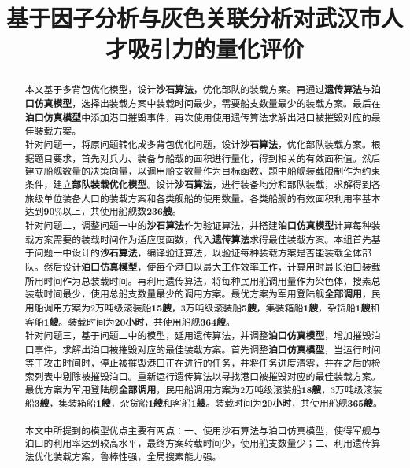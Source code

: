 \documentclass{whutmod}
\title{基于因子分析与灰色关联分析对武汉市人才吸引力的量化评价}
\begin{document}
	
	\begin{abstract}



本文基于多背包优化模型，设计\textbf{沙石算法}，优化部队的装载方案。再通过\textbf{遗传算法}与\textbf{泊口仿真模型}，选择出装载方案中装载时间最少，需要船支数量最少的装载方案。最后在\textbf{泊口仿真模型}中添加港口摧毁事件，再次使用使用遗传算法求解出港口被摧毁对应的最佳装载方案。
~\\

针对问题一，将原问题转化成多背包优化问题，设计\textbf{沙石算法}，优化部队装载方案。根据题目要求，首先对兵力、装备与船载的面积进行量化，得到相关的有效面积值。然后建立船舰数量的决策向量，以调用船支数量作为目标函数，题中船舰装载限制作为约束条件，建立\textbf{部队装载优化模型}。设计\textbf{沙石算法}，进行装备均分和部队装载，求解得到各旅级单位装备人口的装载方案和各类舰船的使用数量。各类船舰的有效面积利用率基本达到$\textbf{90\%}$以上，共使用船舰数\textbf{236艘}。
~\\



针对问题二，调整问题一中的\textbf{沙石算法}作为验证算法，并搭建\textbf{泊口仿真模型}计算每种装载方案需要的装载时间作为适应度函数，代入\textbf{遗传算法}求得最佳装载方案。本组首先基于问题一中设计的\textbf{沙石算法}，编译验证算法，以验证每种装载方案是否能装载全体部队。然后设计\textbf{泊口仿真模型}，使每个港口以最大工作效率工作，计算用时最长泊口装载所用时间作为总装载时间。再利用遗传算法，将每种民用船调用量作为染色体，搜素总装载时间最少，使用总船支数量最少的调用方案。最优方案为军用登陆舰\textbf{全部调用}，民用船调用方案为2万吨级滚装船\textbf{15艘}，3万吨级滚装船\textbf{5艘}，集装箱船\textbf{1艘}，杂货船\textbf{1艘}和客船\textbf{1艘}。装载时间为\textbf{20小时}，共使用船舰\textbf{364艘}。
~\\

针对问题三，基于问题二中的模型，延用遗传算法，并调整\textbf{泊口仿真模型}，增加摧毁泊口事件，求解出泊口被摧毁对应的最佳装载方案。首先调整\textbf{泊口仿真模型}，当运行时间等于攻击时间时，停止被摧毁港口正在进行的任务，并将任务进度清零，并在之后的检索列表中剔除被摧毁泊口。重新运行遗传算法以寻找港口被摧毁对应的最佳装载方案。最优方案为军用登陆舰\textbf{全部调用}，民用船调用方案为2万吨级滚装船\textbf{18艘}，3万吨级滚装船\textbf{3艘}，集装箱船\textbf{1艘}，杂货船\textbf{1艘}和客船\textbf{1艘}。装载时间为\textbf{20小时}，共使用船舰\textbf{365艘}。
~\\

本文中所提到的模型优点主要有两点：一、使用沙石算法与泊口仿真模型，使得军舰与泊口的利用率达到较高水平，最终方案转载时间少，使用船支数量少；二、利用遗传算法优化装载方案，鲁棒性强，全局搜素能力强。

	
  



	\end{abstract}
	
\end{document}
